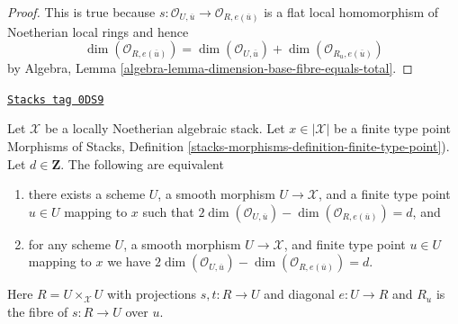 \begin{proof}
This is true because
$s : \mathcal{O}_{U, \overline{u}} \to \mathcal{O}_{R, e(\overline{u})}$
is a flat local homomorphism of Noetherian local rings and hence
$$
\dim(\mathcal{O}_{R, e(\overline{u})}) =
\dim(\mathcal{O}_{U, \overline{u}}) +
\dim(\mathcal{O}_{R_u, e(\overline{u})})
$$
by
Algebra, Lemma \ref{algebra-lemma-dimension-base-fibre-equals-total}.
\end{proof}

\begin{lemma}
\label{stacks-geometry-lemma-dimension-local-ring}
\href{https://stacks.math.columbia.edu/tag/0DS9}{\texttt{Stacks tag 0DS9}}

Let $\mathcal{X}$ be a locally Noetherian algebraic stack.
Let $x \in |\mathcal{X}|$ be a finite type point
Morphisms of Stacks, Definition
\ref{stacks-morphisms-definition-finite-type-point}).
Let $d \in \mathbf{Z}$.
The following are equivalent
\begin{enumerate}
\item there exists a scheme $U$, a smooth morphism $U \to \mathcal{X}$,
and a finite type point $u \in U$ mapping to $x$ such that
$2\dim(\mathcal{O}_{U, \overline{u}}) -
\dim(\mathcal{O}_{R, e(\overline{u})}) = d$, and
\item for any scheme $U$, a smooth morphism $U \to \mathcal{X}$,
and finite type point $u \in U$ mapping to $x$ we have
$2\dim(\mathcal{O}_{U, \overline{u}}) -
\dim(\mathcal{O}_{R, e(\overline{u})}) = d$.
\end{enumerate}
Here $R = U \times_\mathcal{X} U$ with projections $s, t : R \to U$ and
diagonal $e : U \to R$ and $R_u$ is the fibre of $s : R \to U$ over $u$.
\end{lemma}

